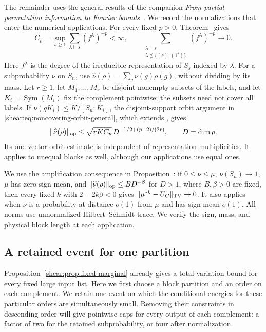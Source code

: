 The remainder uses the general results of the companion
\emph{From partial permutation information to Fourier bounds}~\cite{partial-fourier}.
We record the normalizations that enter the numerical applications.
For every fixed $p>0$, Theorem~ gives
\[
 C_p=\sup_{s\ge1}\sum_{\lambda\vdash s}(f^\lambda)^{-p}<\infty,
 \qquad
 \sum_{\substack{\lambda\vdash s\\
                 \lambda\notin\{(s),(1^s)\}}}(f^\lambda)^{-p}\longrightarrow0.
\]
Here $f^\lambda$ is the degree of the irreducible representation of
$S_s$ indexed by $\lambda$. For a subprobability $\nu$ on $S_n$, use
$\widehat\nu(\rho)=\sum_g\nu(g)\rho(g)$, without dividing by its mass.
Let $r\ge1$, let $M_1,\ldots,M_r$ be disjoint nonempty subsets
of the labels, and let $K_i=\operatorname{Sym}(M_i)$ fix the complement
pointwise; the subsets need not cover all labels. If
$\nu(gK_i)\le K/[S_n:K_i]$, the disjoint-support orbit argument
in \eqref{shear:eq:noncovering-orbit-general}, which extends
\cite[Proposition~]{partial-fourier}, gives
\begin{equation}
 \|\widehat\nu(\rho)\|_{\rm op}
 \le\sqrt{rKC_p}\,D^{-1/2+(p+2)/(2r)},\qquad D=\dim\rho.
 \label{frames:coset-fourier}
\end{equation}
Its one-vector orbit estimate is independent of representation
multiplicities. It applies to unequal blocks as well, although our
applications use equal ones.

We use the amplification consequence in Proposition~:
if $0\le\nu\le\mu$, $\nu(S_n)\to1$, $\mu$ has zero sign mean, and
$\|\widehat\nu(\rho)\|_{\rm op}\le B D^{-\beta}$ for $D>1$,
where $B,\beta>0$ are fixed, then every fixed $k$ with
$2-2k\beta<0$ gives
$\|\mu^{*k}-U_G\|_{\rm TV}\to0$. It also applies when $\nu$ is a
probability at distance $o(1)$ from $\mu$ and has sign mean $o(1)$.
All norms use unnormalized Hilbert--Schmidt trace. We verify the sign,
mass, and physical block length at each application.

\subsection{A retained event for one partition}
\label{frames:pointwise-section}

Proposition~\ref{shear:prop:fixed-marginal} already gives a
total-variation bound for every fixed large input list. Here we first
choose a block partition and an order on each complement. We retain one
event on which the conditional energies for these particular orders
are simultaneously small. Removing their constraints in descending
order will give pointwise caps for every output of each complement:
a factor of two for the retained subprobability, or four after
normalization.

